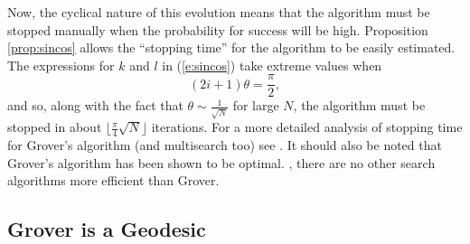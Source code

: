 Now, the cyclical nature of this evolution means that the
algorithm must be stopped manually when the probability 
for success will be high.
Proposition \ref{prop:sincos} allows the ``stopping time''
for the algorithm to be easily estimated.  The expressions 
for $k$ and $l$ in (\ref{e:sincos}) take extreme values 
when
\begin{equation}
(2i+1)\theta = \frac{\pi}{2},
\end{equation}
and so, along with the fact that $\theta\sim\frac{1}{\sqrt{N}}$ 
for large $N$, 
the algorithm must be stopped in about 
$\lfloor\frac{\pi}{4}\sqrt{N}\rfloor$ iterations.
For a more detailed analysis of stopping time for Grover's
algorithm (and multisearch too) see \cite{Grover:96a,Boyer/Brassard/Hoyer/Tapp:96}.
It should also be noted that
Grover's algorithm has been 
shown\cite{Bennet/Brassard/Bernstein/Vazirani:97,Zalka:97}
to be optimal.  \ie, there are no other search algorithms
more efficient than Grover.



%

\subsection{Grover is a Geodesic}

